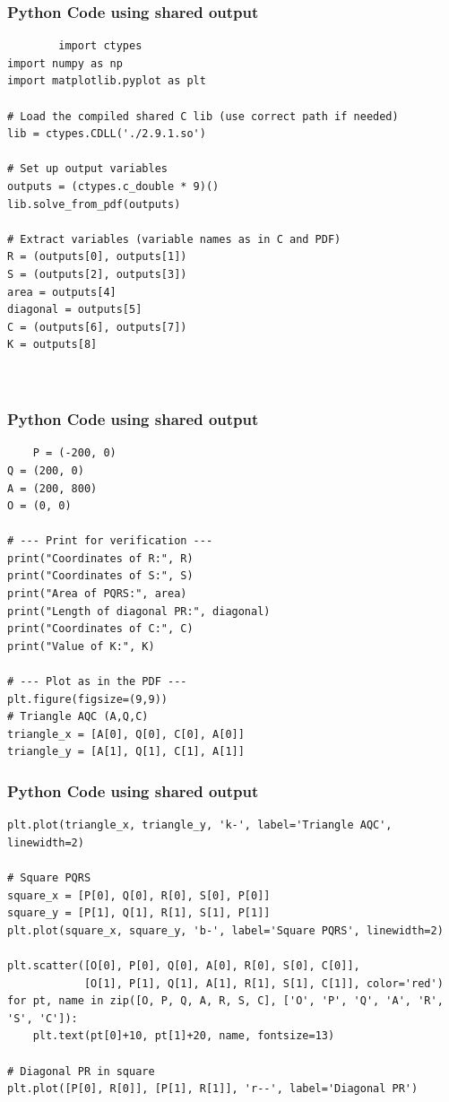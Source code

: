 \documentclass{beamer}
\begin{document}
\begin{frame}[fragile]
	\frametitle{Python Code using shared output}
	\begin{lstlisting}
		import ctypes
import numpy as np
import matplotlib.pyplot as plt

# Load the compiled shared C lib (use correct path if needed)
lib = ctypes.CDLL('./2.9.1.so')

# Set up output variables
outputs = (ctypes.c_double * 9)()
lib.solve_from_pdf(outputs)

# Extract variables (variable names as in C and PDF)
R = (outputs[0], outputs[1])
S = (outputs[2], outputs[3])
area = outputs[4]
diagonal = outputs[5]
C = (outputs[6], outputs[7])
K = outputs[8]



	\end{lstlisting}
\end{frame}
\begin{frame}[fragile]
	\frametitle{Python Code using shared output}
	\begin{lstlisting}	
    P = (-200, 0)
Q = (200, 0)
A = (200, 800)
O = (0, 0)

# --- Print for verification ---
print("Coordinates of R:", R)
print("Coordinates of S:", S)
print("Area of PQRS:", area)
print("Length of diagonal PR:", diagonal)
print("Coordinates of C:", C)
print("Value of K:", K)

# --- Plot as in the PDF ---
plt.figure(figsize=(9,9))
# Triangle AQC (A,Q,C)
triangle_x = [A[0], Q[0], C[0], A[0]]
triangle_y = [A[1], Q[1], C[1], A[1]]

	\end{lstlisting}
\end{frame}
\begin{frame}[fragile]
	\frametitle{Python Code using shared output}
	\begin{lstlisting}
plt.plot(triangle_x, triangle_y, 'k-', label='Triangle AQC', linewidth=2)

# Square PQRS
square_x = [P[0], Q[0], R[0], S[0], P[0]]
square_y = [P[1], Q[1], R[1], S[1], P[1]]
plt.plot(square_x, square_y, 'b-', label='Square PQRS', linewidth=2)

plt.scatter([O[0], P[0], Q[0], A[0], R[0], S[0], C[0]],
            [O[1], P[1], Q[1], A[1], R[1], S[1], C[1]], color='red')
for pt, name in zip([O, P, Q, A, R, S, C], ['O', 'P', 'Q', 'A', 'R', 'S', 'C']):
    plt.text(pt[0]+10, pt[1]+20, name, fontsize=13)

# Diagonal PR in square
plt.plot([P[0], R[0]], [P[1], R[1]], 'r--', label='Diagonal PR')


	\end{lstlisting}
\end{frame}
\end{document}
